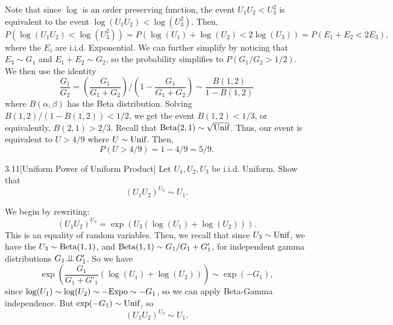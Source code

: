 \documentclass{pset}
\begin{document}
\begin{solution}
  Note that since $\log$ is an order preserving function, the event $U_1U_2 < U_3^2$ is equivalent to the event $\log(U_1U_2) < \log(U_3^2)$. Then,
  \[P(\log(U_1U_2) < \log(U_3^2)) = P(\log(U_1)+\log(U_2) < 2\log(U_3)) = P(E_1 + E_2 < 2E_3), \]
  where the $E_i$ are i.i.d. Exponential. We can further simplify by noticing that $E_3\sim G_1$ and $E_1+E_2\sim G_2$, so the probability simplifies to $P(G_1 / G_2 > 1/2)$. We then use the identity
  \[ \frac{G_1}{G_2} = \left(\frac{G_1}{G_1+G_2}\right) \bigg/ \left(1-\frac{G_1}{G_1 +G_2}\right) \sim \frac{B(1,2)}{1-B(1,2)}\]
  where $B(\alpha, \beta)$ has the Beta distribution. Solving $B(1,2) / (1-B(1,2)) < 1/2$, we get the event $B(1,2) < 1/3$, or equivalently, $B(2,1) > 2/3$. Recall that $\textrm{Beta}(2,1) \sim \sqrt{\textrm{Unif}}$. Thus, our event is equivalent to $U > 4/9$ where $U\sim \textrm{Unif}$. Then,
  \[P(U > 4/9) = 1-4/9 = 5/9.\]
\end{solution}

\begin{problem}{3.11}[Uniform Power of Uniform Product]
  Let $U_1, U_2, U_3$ be i.i.d. Uniform. Show that
  \[ (U_1U_2)^{U_3}\sim U_1.\]
\end{problem}

\begin{solution}
  We begin by rewriting:
  \[(U_1 U_2)^{U_3} = \exp(U_3(\log(U_1) + \log(U_2))).\]
  This is an equality of random variables. Then, we recall that since $U_3\sim \textrm{Unif}$, we have the $U_3\sim \textrm{Beta}(1,1)$, and $\textrm{Beta}(1,1)\sim G_1 / G_1 + G_1'$, for independent gamma distributions $G_1\!\perp\!\!\!\perp\! G'_1$. So we have
  \[\exp\left(\frac{G_1}{G_1 + G'_1} (\log(U_1) + \log(U_2))\right) \sim \exp(-G_1),\]
  since $\log(U_1)\sim \log(U_2)\sim -\textrm{Expo} \sim -G_1$, so we can apply Beta-Gamma independence. But $\exp(-G_1)\sim \textrm{Unif}$, so 
  \[(U_1U_2)^{U_3} \sim U_1.\]
\end{solution}
\end{document}
